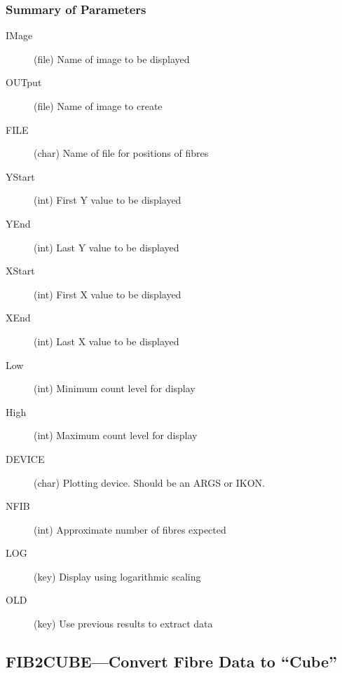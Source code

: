 \subsubsection{Summary of Parameters}

\begin{description}
\item[IMage] (file) Name of image to be displayed 
\item[OUTput] (file) Name of image to create
\item[FILE] (char) Name of file for positions of fibres
\item[YStart] (int) First Y value to be displayed 
\item[YEnd] (int) Last Y value to be displayed 
\item[XStart] (int) First X value to be displayed 
\item[XEnd] (int) Last X value to be displayed 
\item[Low] (int) Minimum count level for display 
\item[High] (int) Maximum count level for display 
\item[DEVICE] (char) Plotting device. Should be an ARGS or IKON.
\item[NFIB] (int) Approximate number of fibres expected
\item[LOG] (key) Display using logarithmic scaling 
\item[OLD] (key) Use previous results to extract data
\end{description}

\subsection{FIB2CUBE---Convert Fibre Data to ``Cube''}

